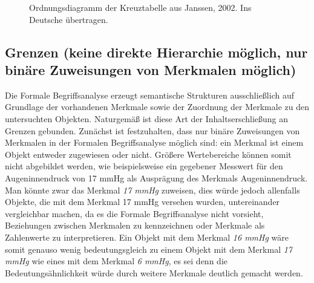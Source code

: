 \documentclass[pagesize,DIV=calc,12pt,draft]{scrreprt}
\begin{document}
\begin{figure}[h!]
\centering
\caption{Ordnungsdiagramm der Kreuztabelle aus Janssen, 2002. Ins Deutsche übertragen.}
\end{figure}

\subsection{Grenzen (keine direkte Hierarchie möglich, nur binäre Zuweisungen von Merkmalen möglich)}

Die Formale Begriffsanalyse erzeugt semantische Strukturen ausschließlich auf Grundlage der vorhandenen Merkmale sowie der Zuordnung der Merkmale zu den untersuchten Objekten. 
Naturgemäß ist diese Art der Inhaltserschließung an Grenzen gebunden. 
Zunächst ist festzuhalten, dass nur binäre Zuweisungen von Merkmalen in der Formalen Begriffsanalyse möglich sind: ein Merkmal ist einem Objekt entweder zugewiesen oder nicht. 
Größere Wertebereiche können somit nicht abgebildet werden, wie beispielsweise ein gegebener Messwert für den Augeninnendruck von 17 mmHg als Ausprägung des Merkmals Augeninnendruck. 
Man könnte zwar das Merkmal \emph{17 mmHg} zuweisen, dies würde jedoch allenfalls Objekte, die mit dem Merkmal 17 mmHg versehen wurden, untereinander vergleichbar machen, da es die Formale Begriffsanalyse nicht vorsieht, Beziehungen zwischen Merkmalen zu kennzeichnen oder Merkmale als Zahlenwerte zu interpretieren. 
Ein Objekt mit dem Merkmal \emph{16 mmHg} wäre somit genauso wenig bedeutungsgleich zu einem Objekt mit dem Merkmal \emph{17 mmHg} wie eines mit dem Merkmal \emph{6 mmHg}, es sei denn die Bedeutungsähnlichkeit würde durch weitere Merkmale deutlich gemacht werden. 
\end{document}
